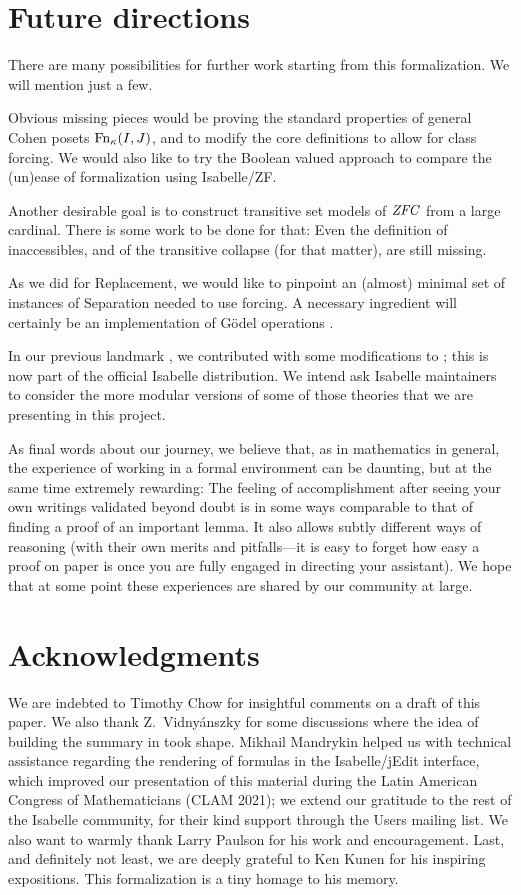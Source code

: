 \section{Future directions}
\label{sec:conclusion}

There are many possibilities for further work starting from this
formalization. We will mention just a few.

Obvious missing pieces would be proving the standard properties of
general Cohen posets $\operatorname{Fn}_\kappa(I,J)$, and to modify the core
definitions to allow for class forcing. We would also like to try the
Boolean valued approach to compare the (un)ease of formalization using
Isabelle/ZF.

Another desirable goal is to construct transitive set models of $\mathit{ZFC}$
from a large cardinal. There is some work to be done for that: Even the
definition of inaccessibles, and of the transitive collapse (for that
matter), are still missing.

As we did for Replacement, we would like to pinpoint an (almost)
minimal set of instances of
Separation needed to use forcing. A necessary ingredient will
certainly be an implementation of Gödel operations
\cite[Thm.~13.4]{Jech_Millennium}.

In our previous landmark \cite{2020arXiv200109715G}, we contributed
with some modifications to ; this is now
part of the official Isabelle distribution.  We intend ask Isabelle
maintainers to consider the more modular versions of some of those
theories that we are presenting in this project.

As final words about our journey, we believe that, as in mathematics
in general, the experience of working in a formal environment can be
daunting, but at the same time extremely rewarding: The feeling of
accomplishment after seeing your own writings validated beyond doubt is
in some ways comparable to that of finding a proof of an important
lemma. It also allows subtly different ways of reasoning (with their
own merits and pitfalls---it is easy to forget how easy a proof on
paper is once you are fully engaged in directing your assistant). We
hope that at some point these experiences are shared by our community
at large.


\section*{Acknowledgments}
\label{sec:acknowledgments}
We are indebted to Timothy Chow for insightful comments on a draft of
this paper. We also thank Z.~Vidnyánszky for some discussions where the idea of
building the summary in  took shape.
Mikhail Mandrykin helped us with technical assistance regarding the
rendering of formulas in the Isabelle/jEdit interface, which improved
our presentation of this material during the Latin American Congress
of Mathematicians (CLAM 2021); we extend our gratitude to the rest of
the Isabelle community, for their kind support through the Users mailing
list. We also want to warmly thank Larry Paulson for his work and
encouragement.  Last, and definitely not least, we are deeply grateful
to Ken Kunen for his
inspiring expositions. This formalization is a tiny homage to his
memory.


